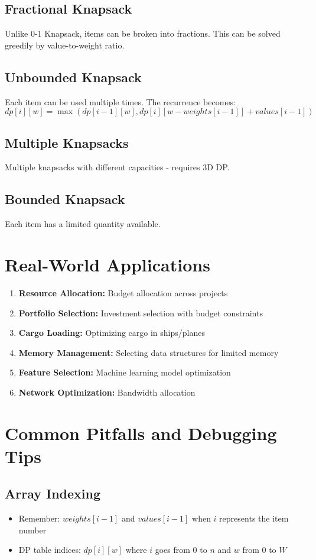 \documentclass[12pt,a4paper]{article}
\begin{document}
\subsection{Fractional Knapsack}
Unlike 0-1 Knapsack, items can be broken into fractions. This can be solved greedily by value-to-weight ratio.

\subsection{Unbounded Knapsack}
Each item can be used multiple times. The recurrence becomes:
$$dp[i][w] = \max(dp[i-1][w], dp[i][w-weights[i-1]] + values[i-1])$$

\subsection{Multiple Knapsacks}
Multiple knapsacks with different capacities - requires 3D DP.

\subsection{Bounded Knapsack}
Each item has a limited quantity available.

\section{Real-World Applications}

\begin{enumerate}
\item \textbf{Resource Allocation:} Budget allocation across projects
\item \textbf{Portfolio Selection:} Investment selection with budget constraints
\item \textbf{Cargo Loading:} Optimizing cargo in ships/planes
\item \textbf{Memory Management:} Selecting data structures for limited memory
\item \textbf{Feature Selection:} Machine learning model optimization
\item \textbf{Network Optimization:} Bandwidth allocation
\end{enumerate}

\section{Common Pitfalls and Debugging Tips}

\subsection{Array Indexing}
\begin{itemize}
\item Remember: $weights[i-1]$ and $values[i-1]$ when $i$ represents the item number
\item DP table indices: $dp[i][w]$ where $i$ goes from 0 to $n$ and $w$ from 0 to $W$
\end{itemize}
\end{document}
